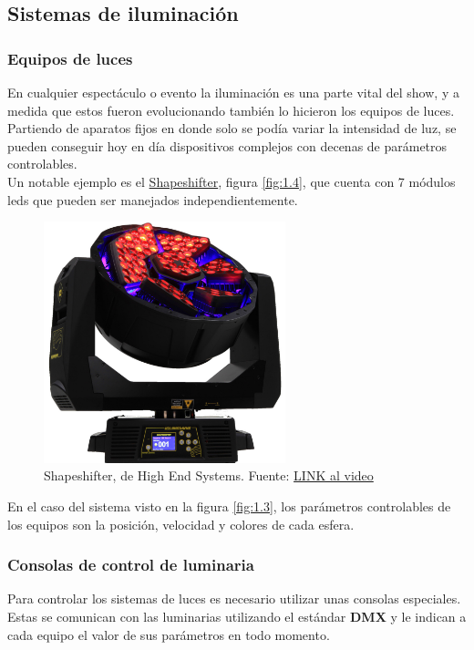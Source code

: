 

\subsection{Sistemas de iluminación} 
\subsubsection{Equipos de luces}
En cualquier espectáculo o evento la iluminación es una parte vital del show, y a medida que estos fueron evolucionando también lo hicieron los equipos de luces. Partiendo de aparatos fijos en donde solo se podía variar la intensidad de luz, se pueden conseguir hoy en día dispositivos complejos con decenas de parámetros controlables.\\
Un notable ejemplo es el \href{http://preworks.at/index.php/en/products/led-automated-luminairies/shapeshifter}{Shapeshifter}, figura \ref{fig:1.4}, que cuenta con 7 módulos leds que pueden ser manejados independientemente.

\begin{figure}[!ht]
	\centering
	\includegraphics[width=7cm,scale=1]{resources/1_4-shapeshifter.jpg}
	\caption{Shapeshifter, de High End Systems. Fuente: \href{https://www.youtube.com/watch?v=LIIE3zZscYY}{LINK al video} }
	\label{fig:\thefigure}
\end{figure}

En el caso del sistema visto en la figura \ref{fig:1.3}, los parámetros controlables de los equipos son la posición, velocidad y colores de cada esfera.

\subsubsection{Consolas de control de luminaria}
Para controlar los sistemas de luces es necesario utilizar unas consolas especiales. Estas se comunican con las luminarias utilizando el estándar \textbf{DMX} y le indican a cada equipo el valor de sus parámetros en todo momento.

